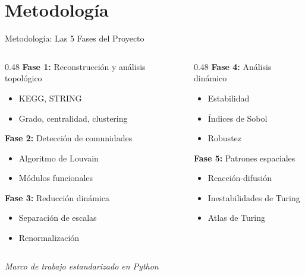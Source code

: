 \documentclass[aspectratio=169, 11pt]{beamer}
\begin{document}
	\section{Metodología}
	\begin{frame}{Metodología: Las 5 Fases del Proyecto}
		\begin{columns}
			\begin{column}{0.48\textwidth}
				\textbf{Fase 1:} Reconstrucción y análisis topológico
				\begin{itemize}
					\item KEGG, STRING
					\item Grado, centralidad, clustering
				\end{itemize}
				
				\vspace{0.2cm}
				\textbf{Fase 2:} Detección de comunidades
				\begin{itemize}
					\item Algoritmo de Louvain
					\item Módulos funcionales
				\end{itemize}
				
				\vspace{0.2cm}
				\textbf{Fase 3:} Reducción dinámica
				\begin{itemize}
					\item Separación de escalas
					\item Renormalización
				\end{itemize}
			\end{column}
			\begin{column}{0.48\textwidth}
				\textbf{Fase 4:} Análisis dinámico
				\begin{itemize}
					\item Estabilidad
					\item Índices de Sobol
					\item Robustez
				\end{itemize}
				
				\vspace{0.2cm}
				\textbf{Fase 5:} Patrones espaciales
				\begin{itemize}
					\item Reacción-difusión
					\item Inestabilidades de Turing
					\item Atlas de Turing
				\end{itemize}
			\end{column}
		\end{columns}
		
		\vspace{0.3cm}
		\centering
		\footnotesize \textit{Marco de trabajo estandarizado en Python}
	\end{frame}
	
\end{document}
